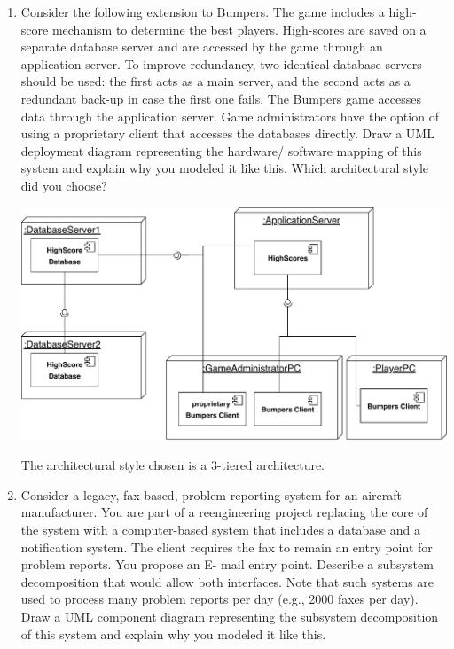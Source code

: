 \documentclass[a4paper, 10pt]{article}
\begin{document}
\begin{enumerate}
    \item
    Consider the following extension to Bumpers. 
    The game includes a high- score mechanism to determine the best players. 
    High-scores are saved on a separate database server and are accessed by the game through an 
    application server. To improve redundancy, two identical database servers should be used: 
    the first acts as a main server, and the second acts as a redundant back-up in case the 
    first one fails. The Bumpers game accesses data through the application server. 
    Game administrators have the option of using a proprietary client that accesses the databases 
    directly. Draw a UML deployment diagram representing the hardware/ software mapping of this 
    system and explain why you modeled it like this. Which architectural style did you choose?
    \vspace{0.5cm}


    \includegraphics[width=\linewidth]{task3.pdf}


    The architectural style chosen is a 3-tiered architecture.
    \item
    Consider a legacy, fax-based, problem-reporting system for an aircraft manufacturer. 
    You are part of a reengineering project replacing the core of the system with a 
    computer-based system that includes a database and a notification system. 
    The client requires the fax to remain an entry point for problem reports. 
    You propose an E- mail entry point. Describe a subsystem decomposition that would allow 
    both interfaces. Note that such systems are used to process many problem reports per 
    day (e.g., 2000 faxes per day). Draw a UML component diagram representing the 
    subsystem decomposition of this system and explain why you modeled it like this.
    \vspace{0.5cm}


\end{enumerate}
\end{document}

